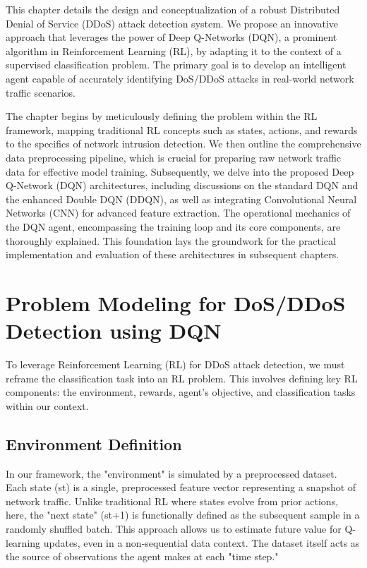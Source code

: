 \documentclass{report}
\begin{document}
This chapter details the design and conceptualization of a robust Distributed Denial of Service (DDoS) attack detection system. We propose an innovative approach that leverages the power of Deep Q-Networks (DQN), a prominent algorithm in Reinforcement Learning (RL), by adapting it to the context of a supervised classification problem. The primary goal is to develop an intelligent agent capable of accurately identifying DoS/DDoS attacks in real-world network traffic scenarios.

The chapter begins by meticulously defining the problem within the RL framework, mapping traditional RL concepts such as states, actions, and rewards to the specifics of network intrusion detection. We then outline the comprehensive data preprocessing pipeline, which is crucial for preparing raw network traffic data for effective model training. Subsequently, we delve into the proposed Deep Q-Network (DQN) architectures, including discussions on the standard DQN and the enhanced Double DQN (DDQN), as well as integrating Convolutional Neural Networks (CNN) for advanced feature extraction. The operational mechanics of the DQN agent, encompassing the training loop and its core components, are thoroughly explained. This foundation lays the groundwork for the practical implementation and evaluation of these architectures in subsequent chapters.

\section{Problem Modeling for DoS/DDoS Detection using DQN}

To leverage Reinforcement Learning (RL) for DDoS attack detection, we must reframe the classification task into an RL problem. This involves defining key RL components: the environment, rewards, agent's objective, and classification tasks within our context.

\subsection{Environment Definition}
In our framework, the "environment" is simulated by a preprocessed dataset. Each state (st​) is a single, preprocessed feature vector representing a snapshot of network traffic. Unlike traditional RL where states evolve from prior actions, here, the "next state" (st+1​) is functionally defined as the subsequent sample in a randomly shuffled batch. This approach allows us to estimate future value for Q-learning updates, even in a non-sequential data context. The dataset itself acts as the source of observations the agent makes at each "time step."
\end{document}
